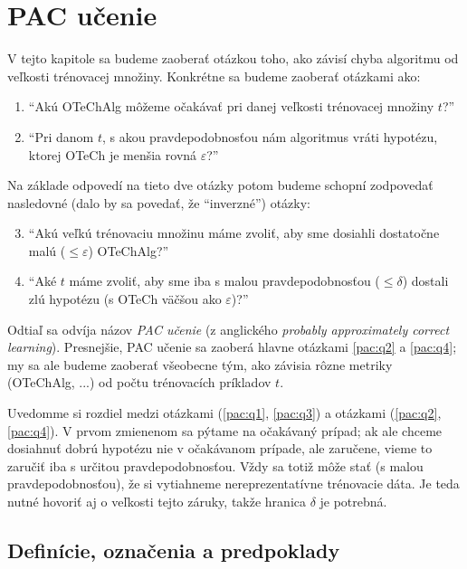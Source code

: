 \chapter{PAC učenie}

V tejto kapitole sa budeme zaoberať otázkou toho, ako závisí chyba
algoritmu od veľkosti trénovacej množiny. Konkrétne sa budeme
zaoberať otázkami ako:
\begin{enumerate}
  \item ``Akú OTeChAlg môžeme očakávať pri danej veľkosti trénovacej množiny $t$?'' \label{pac:q1}
  \item ``Pri danom $t$, s akou pravdepodobnosťou nám algoritmus vráti
    hypotézu, ktorej OTeCh je menšia rovná $\varepsilon$?'' \label{pac:q2}
\end{enumerate}
Na základe odpovedí na tieto dve otázky potom budeme schopní zodpovedať
nasledovné (dalo by sa povedať, že ``inverzné'') otázky:
\begin{enumerate}
  \setcounter{enumi}{2}
  \item ``Akú veľkú trénovaciu množinu máme zvoliť, aby sme dosiahli
    dostatočne malú ($\leq \varepsilon$) OTeChAlg?'' \label{pac:q3}
  \item ``Aké $t$ máme zvoliť, aby sme iba s malou pravdepodobnosťou
    ($\leq \delta$) dostali zlú hypotézu (s OTeCh väčšou ako $\varepsilon$)?'' \label{pac:q4}
\end{enumerate}

Odtiaľ sa odvíja názov \emph{PAC učenie} (z anglického
\emph{probably approximately correct learning}). Presnejšie, PAC učenie
sa zaoberá hlavne otázkami \ref{pac:q2} a \ref{pac:q4}; my sa ale budeme
zaoberať všeobecne tým, ako závisia rôzne metriky (OTeChAlg, ...) od
počtu trénovacích príkladov $t$.

Uvedomme si rozdiel medzi otázkami (\ref{pac:q1}, \ref{pac:q3}) a otázkami
(\ref{pac:q2}, \ref{pac:q4}). V prvom zmienenom sa pýtame na očakávaný
prípad; ak ale chceme dosiahnuť dobrú hypotézu nie v očakávanom prípade,
ale zaručene, vieme to zaručiť iba s určitou pravdepodobnosťou. Vždy sa
totiž môže stať (s malou pravdepodobnosťou), že si vytiahneme
nereprezentatívne trénovacie dáta. Je teda nutné hovoriť aj o
veľkosti tejto záruky, takže hranica $\delta$ je potrebná.




\section{Definície, označenia a predpoklady}

